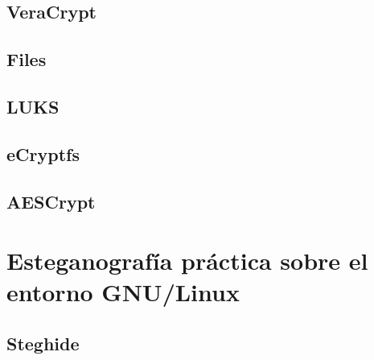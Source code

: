 \documentclass[a4paper, 11pt, titlepage]{article}
\begin{document}
    \subsection{VeraCrypt}
    \subsection{Files}
    \subsection{LUKS}
    \subsection{eCryptfs}
    \subsection{AESCrypt}

\section{Esteganografía práctica sobre el entorno GNU/Linux}

    \subsection{Steghide}

\end{document}
